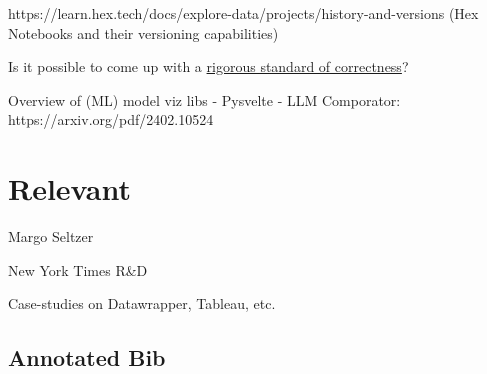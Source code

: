 \documentclass[
]{article}
\begin{document}
https://learn.hex.tech/docs/explore-data/projects/history-and-versions
(Hex Notebooks and their versioning capabilities)

Is it possible to come up with a
\href{https://dl.acm.org/doi/pdf/10.1145/3236386.3241340}{rigorous
standard of correctness}?

Overview of (ML) model viz libs - Pysvelte - LLM Comporator:
https://arxiv.org/pdf/2402.10524

\section{Relevant}\label{relevant}

Margo Seltzer

New York Times R\&D

Case-studies on Datawrapper, Tableau, etc.

\subsection{Annotated Bib}\label{annotated-bib}
\end{document}
